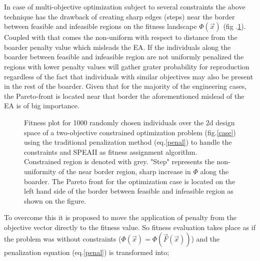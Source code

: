 In case of multi-objective optimization subject to several constraints the above technique has the drawback of creating sharp edges (steps) near the border between feasible and infeasible regions on the fitness landscape $\Phi(\vec{x})$  (fig .\ref{fit1}). Coupled with that comes the non-uniform with respect to distance from the boarder penalty value which misleads the EA. If the individuals along the boarder between feasible and infeasible region are not uniformly penalized the regions with lower penalty values will gather grater probability for reproduction regardless of the fact that individuals with similar objectives may also be present in the rest of the boarder. Given that for the majority of the engineering cases, the Pareto-front is located near that border the aforementioned mislead of the EA is of big importance.


\begin{figure}[h!]
\begin{minipage}[b]{1.0\linewidth}
 \centering
\end{minipage}
\caption{Fitness plot for 1000 randomly chosen individuals over the 2d design space of a two-objective constrained optimization problem (fig.\ref{case}) using the traditional penalization method (eq.\ref{penal}) to handle the constraints and SPEAII as fitness assignment algorithm. Constrained region is denoted with grey. "Step" represents the non-uniformity of the near border region, sharp increase in $\Phi$ along the boarder. The Pareto front for the optimization case is located on the left hand side of the border between feasible and infeasible region as shown on the figure.}
\label{fit1}
\end{figure}

To overcome this it is proposed to move the application of penalty from the objective vector directly to the fitness value. So fitness evaluation takes place as if the problem was without constraints ($\Phi(\vec{x})=\Phi(\vec{F}(\vec{x}))$) and the penalization equation (eq.\ref{penal}) is transformed into; 


